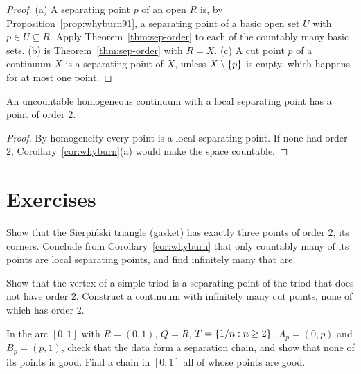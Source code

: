 \begin{proof}
(a) A separating point $p$ of an open $R$ is, by Proposition~\ref{prop:whyburn91}, a separating point of a basic open set $U$ with $p\in U\subseteq R$. Apply
Theorem~\ref{thm:sep-order} to each of the countably many basic sets. (b) is Theorem~\ref{thm:sep-order} with $R=X$. (c) A cut point $p$ of a continuum $X$ is a
separating point of $X$, unless $X\setminus\left\{ p \right\}$ is empty, which happens for at most one point.
\end{proof}


\begin{corollary}\label{cor:some-order-two}
An uncountable homogeneous continuum with a local separating point has a point of order $2$.
\end{corollary}

\begin{proof}
By homogeneity every point is a local separating point. If none had order $2$, Corollary~\ref{cor:whyburn}(a) would make the space countable.
\end{proof}


\section*{Exercises}

\begin{exercise}
Show that the Sierpi\'nski triangle (gasket) has exactly three points of order $2$, its corners. Conclude from Corollary~\ref{cor:whyburn} that only countably many of its
points are local separating points, and find infinitely many that are.
\end{exercise}

\begin{exercise}
Show that the vertex of a simple triod is a separating point of the triod that does not have order $2$. Construct a continuum with infinitely many cut
points, none of which has order $2$.
\end{exercise}

\begin{exercise}
In the arc $[0,1]$ with $R=(0,1)$, $Q=R$, $T=\left\{ 1/n:n\ge2 \right\}$, $A_p=(0,p)$ and $B_p=(p,1)$, check that the data form a separation chain, and show
that none of its points is good. Find a chain in $[0,1]$ all of whose points are good.
\end{exercise}
